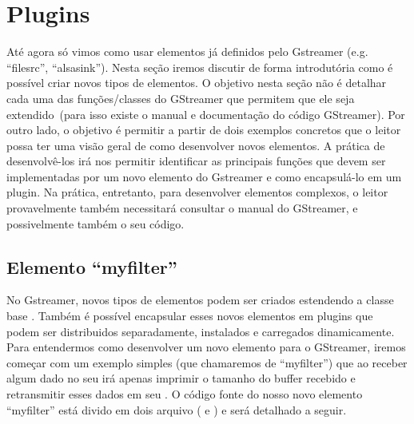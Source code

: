 \section{Plugins}
\label{sec:plugins}


Até agora só vimos como usar elementos já definidos pelo Gstreamer (e.g.
``filesrc'', ``alsasink'').  Nesta seção iremos discutir de forma introdutória
como é possível criar novos tipos de elementos.  O objetivo nesta seção não é
detalhar cada uma das funções/classes do GStreamer que permitem que ele seja
extendido~(para isso existe o manual e documentação do código GStreamer).  Por
outro lado, o objetivo é permitir a partir de dois exemplos concretos que o
leitor possa ter uma visão geral de como desenvolver novos elementos.  A
prática de desenvolvê-los irá nos permitir identificar as principais funções
que devem ser implementadas por um novo elemento do Gstreamer e como
encapsulá-lo em um plugin.  Na prática, entretanto, para desenvolver elementos
complexos, o leitor provavelmente também necessitará consultar o manual do
GStreamer, e possivelmente também o seu código.

\subsection*{Elemento ``myfilter''}
No Gstreamer, novos tipos de elementos podem ser criados estendendo a classe
base .  Também é possível encapsular esses novos elementos em
plugins que podem ser distribuidos separadamente, instalados e carregados
dinamicamente.  Para entendermos como desenvolver um novo elemento para o
GStreamer, iremos começar com um exemplo simples (que chamaremos de
``myfilter'') que ao receber algum dado no seu  irá apenas
imprimir o tamanho do buffer recebido e retransmitir esses dados em seu
.  O código fonte do nosso novo elemento ``myfilter'' está
divido em dois arquivo ( e ) e será detalhado a
seguir.

